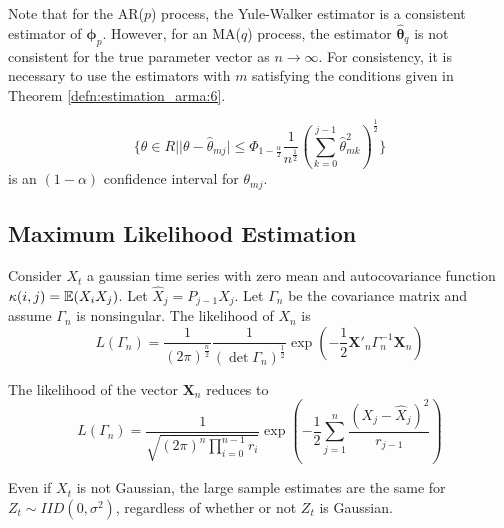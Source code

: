 \begin{remark}
  Note that for the AR($p$) process, the Yule-Walker estimator is a
  consistent estimator of $\mathbf{\phi}_{p}$. However, for an MA($q$)
  process, the estimator $\hat{\mathbf{\theta}}_{q}$ is not consistent
  for the true parameter vector as $n \rightarrow \infty$.  For
  consistency, it is necessary to use the estimators with $m$
  satisfying the conditions given in Theorem
  \ref{defn:estimation_arma:6}.
\end{remark}

\begin{thm}
  \label{defn:estimation_arma:7}
  \begin{equation}
    \label{eq:58}
    \{ \theta \in R | |\theta - \hat \theta_{mj}| \leq \Phi_{1 -
      \frac{\alpha}{2}} \frac{1}{n^{\frac{1}{2}}}
    (\sum_{k=0}^{j-1}\hat \theta_{mk}^{2})^{\frac{1}{2}} \} 
  \end{equation} is an $(1 - \alpha)$ confidence interval for $\theta_{mj}$.
\end{thm}

\subsection{Maximum Likelihood Estimation}
\label{sec:maxim-likel-estim}

Consider $X_{t}$ a gaussian time series with zero mean and
autocovariance function $\kappa(i, j) = \E{X_{i} X_{j}}$.  Let $\hat
X_{j} = P_{j-1} X_{j}$.  Let $\Gamma_{n}$ be the covariance matrix and
assume $\Gamma_{n}$ is nonsingular.  The likelihood of $X_{n}$ is
\begin{equation}
  \label{eq:59}
  L(\Gamma_{n}) = \frac{1}{(2 \pi)^{\frac{n}{2}}} \frac{1}{(\det
    \Gamma_{n})^{\frac{1}{2}}} \exp(-\frac{1}{2} \mathbf{X}'_{n}
  \Gamma_{n}^{-1} \mathbf{X}_{n})
\end{equation}

\begin{thm}
  \label{defn:estimation_arma:8}
  The likelihood of the vector $\mathbf{X}_{n}$ reduces to
  \begin{equation}
    \label{eq:60}
    L(\Gamma_{n}) = \frac{1}{\sqrt{(2\pi)^{n} \prod_{i=0}^{n-1}
        r_{i}}} \exp(-\frac{1}{2} \sum_{j=1}^{n} \frac{(X_{j} - \hat X_{j})^{2}}{r_{j-1}})
  \end{equation}
\end{thm}

\begin{remark}
  Even if $X_{t}$ is not Gaussian, the large sample estimates are the
  same for $Z_{t} \sim IID(0, \sigma^{2})$, regardless of whether or
  not $Z_{t}$ is Gaussian.
\end{remark}

